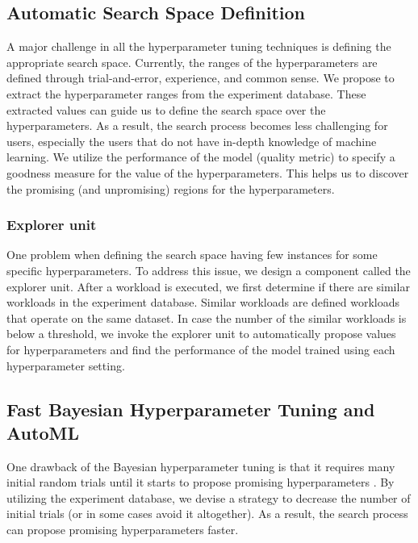 \subsection{Automatic Search Space Definition}\label{sub-section-automatic-search-definition}
A major challenge in all the hyperparameter tuning techniques is defining the appropriate search space.
Currently, the ranges of the hyperparameters are defined through trial-and-error, experience, and common sense.
We propose to extract the hyperparameter ranges from the experiment database.
These extracted values can guide us to define the search space over the hyperparameters.
As a result, the search process becomes less challenging for users, especially the users that do not have in-depth knowledge of machine learning.
We utilize the performance of the model (quality metric) to specify a goodness measure for the value of the hyperparameters.
This helps us to discover the promising (and unpromising) regions for the hyperparameters.

\subsubsection{Explorer unit}
One problem when defining the search space having few instances for some specific hyperparameters.
To address this issue, we design a component called the explorer unit.
After a workload is executed, we first determine if there are similar workloads in the experiment database.
Similar workloads are defined workloads that operate on the same dataset.
In case the number of the similar workloads is below a threshold, we invoke the explorer unit to automatically propose values for hyperparameters and find the performance of the model trained using each hyperparameter setting.

\subsection{Fast Bayesian Hyperparameter Tuning and AutoML}
One drawback of the Bayesian hyperparameter tuning is that it requires many initial random trials until it starts to propose promising hyperparameters \cite{hutter2011sequential,snoek2012practical}.
By utilizing the experiment database, we devise a strategy to decrease the number of initial trials (or in some cases avoid it altogether).
As a result, the search process can propose promising hyperparameters faster.

